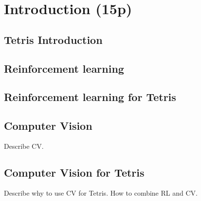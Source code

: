 \section{Introduction (15p)} %
 

\subsection{Tetris Introduction}

\subsection{Reinforcement learning}

\subsection{Reinforcement learning for Tetris}


\subsection{Computer Vision}
Describe CV.

\subsection{Computer Vision for Tetris}
Describe why to use CV for Tetris.
How to combine RL and CV.

